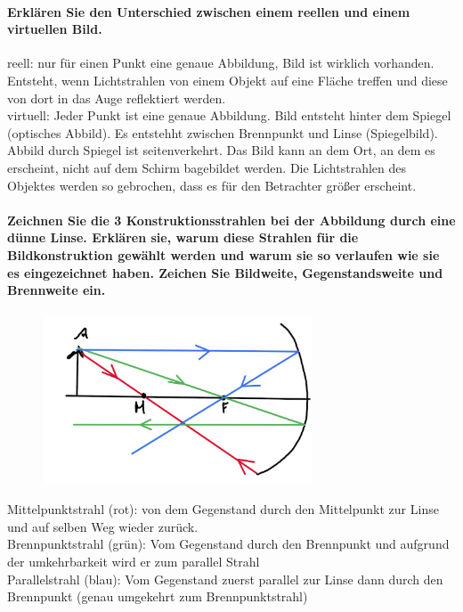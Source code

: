 \documentclass[a4paper, 11pt, ngerman, parskip=half-]{scrartcl}
\begin{document}
\paragraph{Erklären Sie den Unterschied zwischen einem reellen und einem virtuellen Bild.}

reell: nur für einen Punkt eine genaue Abbildung, Bild ist wirklich vorhanden. Entsteht, wenn Lichtstrahlen von einem Objekt auf eine Fläche treffen und diese von dort in das Auge reflektiert werden.\\
virtuell: Jeder Punkt ist eine genaue Abbildung. Bild entsteht hinter dem Spiegel (optisches Abbild). Es entstehht zwischen Brennpunkt und Linse (Spiegelbild).  Abbild durch Spiegel ist seitenverkehrt.  Das Bild kann an dem Ort, an dem es erscheint, nicht auf dem Schirm bagebildet werden. Die Lichtstrahlen des Objektes werden so gebrochen, dass es für den Betrachter größer erscheint.

\paragraph{Zeichnen Sie die 3 Konstruktionsstrahlen bei der Abbildung durch eine dünne Linse.
Erklären sie, warum diese Strahlen für die Bildkonstruktion gewählt werden und warum sie so
verlaufen wie sie es eingezeichnet haben. Zeichen Sie Bildweite, Gegenstandsweite und Brennweite
ein.}

\begin{figure}[H]
    \centering
    \includegraphics[width=8cm]{image/17/geo14}
\end{figure}



Mittelpunktstrahl (rot): von dem Gegenstand durch den Mittelpunkt zur Linse und auf selben Weg wieder zurück.\\
Brennpunktstrahl (grün): Vom Gegenstand durch den Brennpunkt und aufgrund der umkehrbarkeit wird er zum parallel Strahl\\
Parallelstrahl (blau): Vom Gegenstand zuerst parallel zur Linse dann durch den Brennpunkt (genau umgekehrt zum Brennpunktstrahl)
\end{document}

